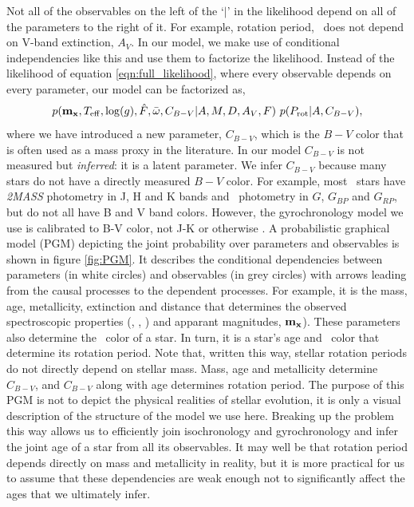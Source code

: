 Not all of the observables on the left of the `$|$' in the likelihood depend
on all of the parameters to the right of it.
For example, rotation period, \prot\ does not depend on V-band extinction,
$A_V$.
In our model, we make use of conditional independencies like this and use them
to factorize the likelihood.
Instead of the likelihood of equation \ref{eqn:full_likelihood},
where every observable depends on every parameter, our model can be factorized
as,
\begin{equation} \label{eqn:factorized}
    p({\bf m_x}, T_{\mathrm{eff}}, \log(g), \hat{F}, \bar{\omega},
    C_{B-V}|A, M, D, A_V, F) ~p(P_\mathrm{rot}|A, C_{B-V}),
\end{equation}
where we have introduced a new parameter, $C_{B-V}$, which is the $B-V$ color
that is often used as a mass proxy in the literature.
In our model $C_{B-V}$ is not measured but {\it inferred}: it is a latent
parameter.
We infer $C_{B-V}$ because many stars do not have a directly measured $B-V$
color.
For example, most \kepler\ stars have {\it 2MASS} photometry in J, H and K
bands and \Gaia\ photometry in $G$, $G_{BP}$ and $G_{RP}$, but do not all have
B and V band colors.
However, the gyrochronology model we use is calibrated to B-V color, not J-K
or otherwise \citep{barnes2007, mamajek2008, angus2015}.
A probabilistic graphical model (PGM) depicting the joint probability over
parameters and observables is shown in figure \ref{fig:PGM}.
It describes the conditional dependencies between parameters (in white
circles) and observables (in grey circles) with arrows leading from the causal
processes to the dependent processes.
For example, it is the mass, age, metallicity, extinction and distance that
determines the observed spectroscopic properties (\teff, \logg, \feh)
and apparant magnitudes, ${\bf m_x}$).
These parameters also determine the \cbv\ color of a star.
In turn, it is a star's age and \cbv\ color that determine its rotation
period.
Note that, written this way, stellar rotation periods do not directly depend
on stellar mass.
Mass, age and metallicity determine $C_{B-V}$, and $C_{B-V}$ along with age
determines rotation period.
The purpose of this PGM is not to depict the physical realities of stellar
evolution, it is only a visual description of the structure of the model we
use here.
Breaking up the problem this way allows us to efficiently join isochronology
and gyrochronology and infer the joint age of a star from all its observables.
It may well be that rotation period depends directly on mass and metallicity
in reality, but it is more practical for us to assume that these dependencies
are weak enough not to significantly affect the ages that we ultimately infer.


